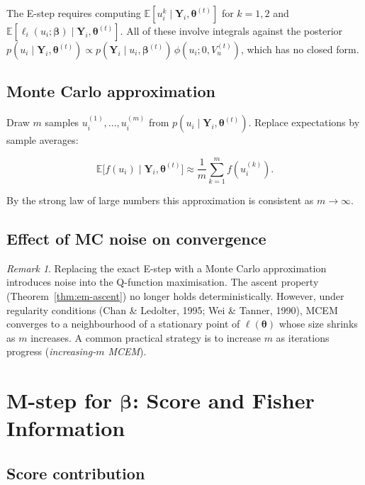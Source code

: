 \documentclass[11pt,a4paper]{article}
\theoremstyle{definition}
\theoremstyle{remark}
\newtheorem{remark}[theorem]{Remark}
\newcommand{\E}{\mathbb{E}}
\newcommand{\bY}{\mathbf{Y}}
\newcommand{\bbeta}{\boldsymbol{\beta}}
\newcommand{\btheta}{\boldsymbol{\theta}}
\newcommand{\given}{\mid}
\begin{document}
The E-step requires computing $\E[u_i^k \given \bY_i, \btheta^{(t)}]$ for $k=1,2$
and $\E[\ell_i(u_i;\bbeta) \given \bY_i, \btheta^{(t)}]$.
All of these involve integrals against the posterior
$p(u_i \given \bY_i, \btheta^{(t)}) \propto
  p(\bY_i \given u_i, \bbeta^{(t)})\, \phi(u_i; 0, V_u^{(t)})$,
which has no closed form.

\subsection{Monte Carlo approximation}

Draw $m$ samples $u_i^{(1)},\ldots,u_i^{(m)}$ from
$p(u_i \given \bY_i, \btheta^{(t)})$.  Replace expectations by sample averages:

\begin{equation}
  \E\bigl[f(u_i) \given \bY_i, \btheta^{(t)}\bigr]
  \approx \frac{1}{m}\sum_{k=1}^m f\!\left(u_i^{(k)}\right).
\end{equation}

By the strong law of large numbers this approximation is consistent as $m\to\infty$.

\subsection{Effect of MC noise on convergence}

\begin{remark}
Replacing the exact E-step with a Monte Carlo approximation introduces noise into
the Q-function maximisation.  The ascent property (Theorem~\ref{thm:em-ascent})
no longer holds deterministically.  However, under regularity conditions (Chan
\& Ledolter, 1995; Wei \& Tanner, 1990), MCEM converges to a neighbourhood of
a stationary point of $\ell(\btheta)$ whose size shrinks as $m$ increases.
A common practical strategy is to increase $m$ as iterations progress
(\emph{increasing-$m$ MCEM}).
\end{remark}

\section{M-step for \texorpdfstring{$\bbeta$}{beta}: Score and Fisher Information}

\subsection{Score contribution}
\end{document}
